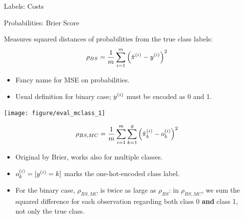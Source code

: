 \documentclass[11pt,compress,t,notes=noshow, xcolor=table]{beamer}
\begin{document}
\begin{vbframe}{Labels: Costs}
\begin{itemize}
  
  \end{itemize}
 
 
\end{vbframe}


\begin{vbframe}{Probabilities: Brier Score}

Measures squared distances of probabilities from the true class labels:
$$\rho_{BS} = \frac{1}{m} \sum_{i = 1}^m 
\left( \hat \pi^{(i)} - y^{(i)} \right)^2$$

\begin{itemize}
  \item Fancy name for MSE on probabilities.
  \item Usual definition for binary case; $y^{(i)}$ must be encoded as 0 and 1.
\end{itemize}

\lz

\begin{knitrout}\scriptsize
{}\color{fgcolor}

{\centering \texttt{[image: figure/eval\_mclass\_1]} 

}

\end{knitrout}


\framebreak

$$\rho_{BS, MC} = \frac{1}{m} \sum_{i = 1}^m \sum\limits_{k=1}^g
\left( \hat \pi_k^{(i)} - o_k^{(i)} \right)^2$$
\begin{itemize}
  \item Original by Brier, works also for multiple classes.
  \item $ o_k^{(i)} = [ y^{(i)} = k ] $ marks the one-hot-encoded class label.
  \item For the binary case, $\rho_{BS, MC}$ is twice as large 
  as $\rho_{BS}$: in $\rho_{BS, MC}$, we sum 
  the squared difference for each observation regarding both class 0 
  \textbf{and} class 1, not only the true class.
\end{itemize}

\end{vbframe}

\end{document}
